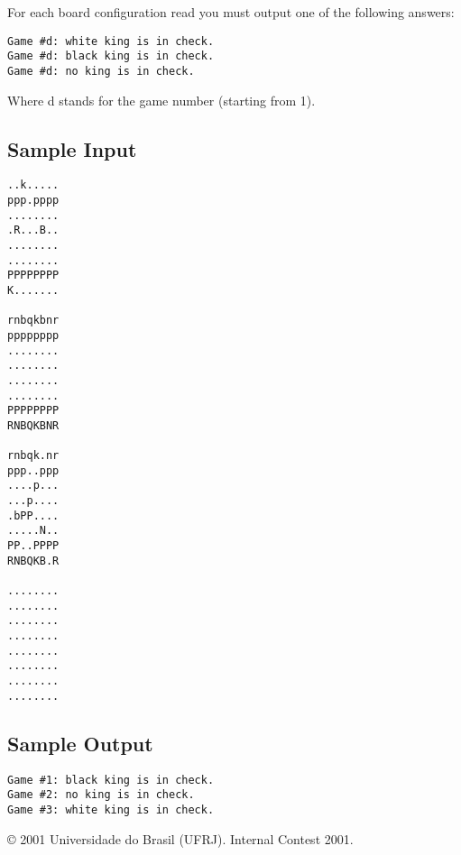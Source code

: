 For each board configuration read you must output one of the following answers:

\begin{verbatim}
Game #d: white king is in check.
Game #d: black king is in check.
Game #d: no king is in check.

\end{verbatim}

Where d stands for the game number (starting from 1).


\subsection{Sample Input}




\begin{verbatim}
..k.....
ppp.pppp
........
.R...B..
........
........
PPPPPPPP
K.......

rnbqkbnr
pppppppp
........
........
........
........
PPPPPPPP
RNBQKBNR

rnbqk.nr
ppp..ppp
....p...
...p....
.bPP....
.....N..
PP..PPPP
RNBQKB.R

........
........
........
........
........
........
........
........

\end{verbatim}



\subsection{Sample Output}




\begin{verbatim}
Game #1: black king is in check.
Game #2: no king is in check.
Game #3: white king is in check.

\end{verbatim}







© 2001 Universidade do Brasil (UFRJ). Internal Contest 2001.






